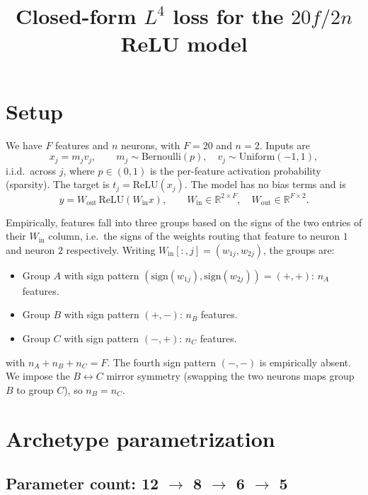 \documentclass[11pt]{article}
\title{Closed-form $L^4$ loss for the $20f/2n$ ReLU model}
\author{}
\date{}
\begin{document}
\maketitle

\section{Setup}

We have $F$ features and $n$ neurons, with $F = 20$ and $n = 2$. Inputs are
\begin{equation*}
x_j = m_j v_j, \qquad m_j \sim \text{Bernoulli}(p), \quad v_j \sim \text{Uniform}(-1, 1),
\end{equation*}
i.i.d.\ across $j$, where $p \in (0, 1)$ is the per-feature activation probability (sparsity). The target is $t_j = \mathrm{ReLU}(x_j)$. The model has no bias terms and is
\begin{equation*}
y = W_{\mathrm{out}} \, \mathrm{ReLU}(W_{\mathrm{in}} x), \qquad
W_{\mathrm{in}} \in \mathbb{R}^{2 \times F}, \quad W_{\mathrm{out}} \in \mathbb{R}^{F \times 2}.
\end{equation*}

Empirically, features fall into three groups based on the signs of the two entries of their $W_{\mathrm{in}}$ column, i.e.\ the signs of the weights routing that feature to neuron $1$ and neuron $2$ respectively. Writing $W_{\mathrm{in}}[:, j] = (w_{1j}, w_{2j})$, the groups are:
\begin{itemize}
\item Group $A$ with sign pattern $(\mathrm{sign}(w_{1j}), \mathrm{sign}(w_{2j})) = (+, +)$: $n_A$ features.
\item Group $B$ with sign pattern $(+, -)$: $n_B$ features.
\item Group $C$ with sign pattern $(-, +)$: $n_C$ features.
\end{itemize}
with $n_A + n_B + n_C = F$. The fourth sign pattern $(-, -)$ is empirically absent. We impose the $B \leftrightarrow C$ mirror symmetry (swapping the two neurons maps group $B$ to group $C$), so $n_B = n_C$.

\section{Archetype parametrization}

\subsection*{Parameter count: 12 $\to$ 8 $\to$ 6 $\to$ 5}
\end{document}
